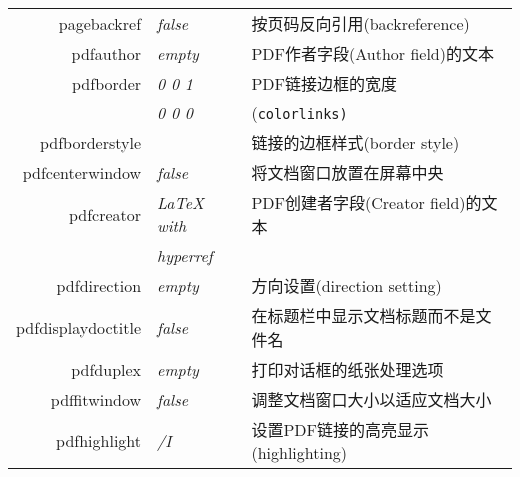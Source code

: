\documentclass{article}
\begin{document}
\begin{longtable}{@{}>{\ttfamily}rlp{7cm}@{}}
    pagebackref                       & \textit{false}         & 按页码反向引用(backreference)                                                                          \\
    pdfauthor                         & \textit{empty}         & PDF作者字段(Author field)的文本                                                                        \\
    pdfborder                         & \textit{0 0 1}         & PDF链接边框的宽度                                                                                      \\
                                      & \textit{0 0 0}         & (\texttt{colorlinks)}                                                                           \\
    pdfborderstyle                    &                        & 链接的边框样式(border style)                                                                           \\
    pdfcenterwindow                   & \textit{false}         & 将文档窗口放置在屏幕中央                                                                                    \\
    pdfcreator                        & \textit{LaTeX with}    & PDF创建者字段(Creator field)的文本                                                                      \\
                                      & \textit{hyperref}      &                                                                                                 \\
    pdfdirection                      & \textit{empty}         & 方向设置(direction setting)                                                                         \\
    pdfdisplaydoctitle                & \textit{false}         & 在标题栏中显示文档标题而不是文件名                                                                               \\
    pdfduplex                         & \textit{empty}         & 打印对话框的纸张处理选项                                                                                    \\
    pdffitwindow                      & \textit{false}         & 调整文档窗口大小以适应文档大小                                                                                 \\
    pdfhighlight                      & \textit{/I}            & 设置PDF链接的高亮显示(highlighting)                                                                      \\

\end{longtable}
\end{document}
